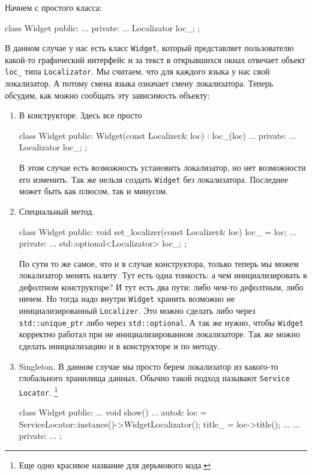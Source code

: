 Начнем с простого класса:
\begin{cppcode}
class Widget {
public:
  ...
private:
  ...
  Localizator loc_;
};
\end{cppcode}
В данном случае у нас есть класс \verb"Widget", который представляет пользователю какой-то графический интерфейс и за текст в открывшихся окнах отвечает объект \verb"loc_" типа \verb"Localizator".
Мы считаем, что для каждого языка у нас свой локализатор.
А потому смена языка означает смену локализатора.
Теперь обсудим, как можно сообщать эту зависимость объекту:
\begin{enumerate}
\item В конструкторе.
Здесь все просто
\begin{cppcode}
class Widget {
public:
  Widget(const Localizer& loc) : loc_(loc) {}
  ...
private:
  ...
  Localizator loc_;
};
\end{cppcode}
В этом случае есть возможность установить локализатор, но нет возможности его изменить.
Так же нельзя создать \verb"Widget" без локализатора.
Последнее может быть как плюсом, так и минусом.

\item Специальный метод.
\begin{cppcode}
class Widget {
public:
  void set_localizer(const Localizer& loc) {
    loc_ = loc;
  }
  ...
private:
  ...
  std::optional<Localizator> loc_;
};
\end{cppcode}
По сути то же самое, что и в случае конструктора, только теперь мы можем локализатор менять налету.
Тут есть одна тонкость: а чем инициализировать в дефолтном конструкторе?
И тут есть два пути: либо чем-то дефолтным, либо ничем. Но тогда надо внутри \verb"Widget" хранить возможно не инициализированный \verb"Localizer". 
Это можно сделать либо через \verb"std::unique_ptr" либо через \verb"std::optional".
А так же нужно, чтобы \verb"Widget" корректно работал при не инициализированном локализаторе.
Так же можно сделать инициализацию и в конструкторе и по методу.

\item Singleton.
В данном случае мы просто берем локализатор из какого-то глобального хранилища данных.
Обычно такой подход  называют \verb"Service Locator".%
\footnote{Еще одно красивое название для дерьмового кода.}
\begin{cppcode}
class Widget {
public:
  ...
  void show() {
    ...
    auto& loc = ServiceLocator::instance()->WidgetLocalizator();
    title_ = loc->title();
    ...
  }
  ...
private:
  ...
};
\end{cppcode}


\end{enumerate}

